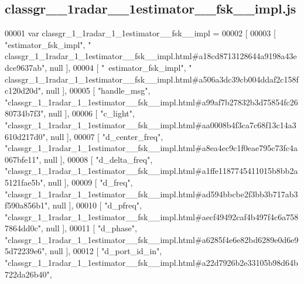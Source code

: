 \subsection{classgr\+\_\+\_\+1radar\+\_\+\_\+1estimator\+\_\+\+\_\+fsk\+\_\+\+\_\+impl.\+js}
\label{classgr__1__1radar__1__1estimator____fsk____impl_8js_source}

\begin{DoxyCode}
00001 var classgr_1_1radar_1_1estimator__fsk__impl =
00002 [
00003     [ \textcolor{stringliteral}{"estimator\_fsk\_impl"}, \textcolor{stringliteral}{"
      classgr\_1\_1radar\_1\_1estimator\_\_fsk\_\_impl.html#a18cd8713128644a9198a43edce9637ab"}, null ],
00004     [ \textcolor{stringliteral}{"~estimator\_fsk\_impl"}, \textcolor{stringliteral}{"
      classgr\_1\_1radar\_1\_1estimator\_\_fsk\_\_impl.html#a506a3dc39cb004ddaf2c158fc120d20d"}, null ],
00005     [ \textcolor{stringliteral}{"handle\_msg"}, \textcolor{stringliteral}{"classgr\_1\_1radar\_1\_1estimator\_\_fsk\_\_impl.html#a99af7b27832b3d75854fc2680734b7f3"}, null
       ],
00006     [ \textcolor{stringliteral}{"c\_light"}, \textcolor{stringliteral}{"classgr\_1\_1radar\_1\_1estimator\_\_fsk\_\_impl.html#aa0008b4f3ca7c68f13c14a3610d217d0"}, null ],
00007     [ \textcolor{stringliteral}{"d\_center\_freq"}, \textcolor{stringliteral}{"classgr\_1\_1radar\_1\_1estimator\_\_fsk\_\_impl.html#a8ea4ec9c1f0eae795c73fc4a067bfe11"}, 
      null ],
00008     [ \textcolor{stringliteral}{"d\_delta\_freq"}, \textcolor{stringliteral}{"classgr\_1\_1radar\_1\_1estimator\_\_fsk\_\_impl.html#a1ffe1187745411015b8bb2a5121fae5b"}, 
      null ],
00009     [ \textcolor{stringliteral}{"d\_freq"}, \textcolor{stringliteral}{"classgr\_1\_1radar\_1\_1estimator\_\_fsk\_\_impl.html#ad594bbcbe2f3bb3b717ab3f590a856b1"}, null ],
00010     [ \textcolor{stringliteral}{"d\_pfreq"}, \textcolor{stringliteral}{"classgr\_1\_1radar\_1\_1estimator\_\_fsk\_\_impl.html#aecf49492caf4b497f4c6a7587864dd0c"}, null ],
00011     [ \textcolor{stringliteral}{"d\_phase"}, \textcolor{stringliteral}{"classgr\_1\_1radar\_1\_1estimator\_\_fsk\_\_impl.html#a6285f4e6e82bd6289e0d6e95d72239e6"}, null ],
00012     [ \textcolor{stringliteral}{"d\_port\_id\_in"}, \textcolor{stringliteral}{"classgr\_1\_1radar\_1\_1estimator\_\_fsk\_\_impl.html#a22d7926b2e33105b98d64b722da26b40"}, 

\end{DoxyCode}
